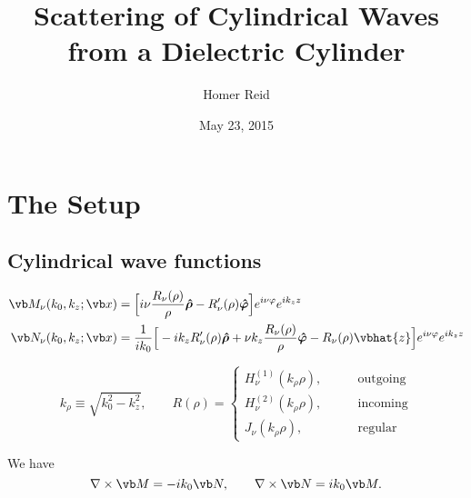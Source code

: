 \documentclass[letterpaper]{article}
\title {Scattering of Cylindrical Waves from a Dielectric Cylinder}
\author {Homer Reid}
\date {May 23, 2015}
\newcommand{\vbhatt}[1]{\boldsymbol{\hat #1}}
\begin{document}
\pagestyle{myheadings}
\maketitle

\tableofcontents

\newpage
\section{The Setup}

\subsection{Cylindrical wave functions}

\begin{align*}
 \vb M_{\nu}(k_0, k_z; \vb x) 
   &= \Big[   i\nu\frac{R_\nu(\rho)}{\rho}\vbhatt{\rho} 
                  - R_\nu^\prime(\rho) \vbhatt{\varphi} 
      \Big]e^{i\nu\varphi} e^{ik_z z} 
\\
 \vb N_\nu(k_0, k_z; \vb x) 
&=\frac{1}{ik_0}
      \Big[ -ik_z R_\nu^\prime(\rho)          \vbhatt{\rho}
            +\nu k_z \frac{R_\nu(\rho)}{\rho} \vbhatt{\varphi}
            - R_\nu(\rho)\vbhat{z}
      \Big] e^{i\nu\varphi} e^{ik_z z} 
\end{align*}

$$ 
 k_\rho\equiv \sqrt{k_0^2 - k_z^2},
 \qquad
 R(\rho) =
 \begin{cases}
   H^{(1)}_\nu(k_\rho \rho), \qquad &\text{outgoing} \\
   H^{(2)}_\nu(k_\rho \rho), \qquad &\text{incoming} \\
   J_\nu      (k_\rho \rho), \qquad &\text{regular}
 \end{cases}
$$

We have 
$$ \nabla \times \vb M = -ik_0 \vb N, 
   \qquad 
   \nabla \times \vb N = ik_0 \vb M.
$$
\end{document}
